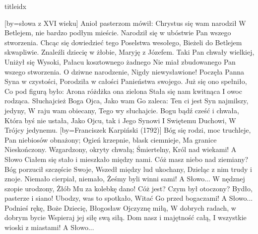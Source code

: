 \documentclass[a5paper, portrait, 12pt]{mwart}
\begin{document}
\begin{songs}{titleidx}

[by={słowa z XVI wieku}]
\beginverse
    Anioł pasterzom mówił:
    Chrystus się wam narodził
    W Betlejem, nie bardzo podłym mieście.
    Narodził się w ubóstwie
    Pan wszego stworzenia.
\endverse
\beginverse
    Chcąc się dowiedzieć tego
    Poselstwa wesołego,
    Bieżeli do Betlejem skwapliwie.
    Znaleźli dziecię w żłobie,
    Maryję z Józefem.
\endverse
\beginverse
    Taki Pan chwały wielkiej,
    Uniżył się Wysoki,
    Pałacu kosztownego żadnego
    Nie miał zbudowanego
    Pan wszego stworzenia.
\endverse
\beginverse
    O dziwne narodzenie,
    Nigdy niewysławione!
    Poczęła Panna Syna w czystości,
    Porodziła w całości
    Panieństwa swojego.
\endverse
\beginverse %
    Już się ono spełniło,
    Co pod figurą było:
    Arona różdżka ona zielona
    Stała się nam kwitnąca
    I owoc rodząca.
\endverse
\beginverse
    Słuchajcież Boga Ojca,
    Jako wam Go zaleca:
    Ten ci jest Syn najmilszy, jedyny,
    W raju wam obiecany,
    Tego wy słuchajcie.
\endverse
\beginverse
    Bogu bądź cześć i chwała,
    Która byś nie ustała,
    Jako Ojcu, tak i Jego Synowi
    I Swiętemu Duchowi,
    W Trójcy jedynemu.
\endverse
\endsong
[by={Franciszek Karpiński (1792)}]
\beginverse
    Bóg się rodzi, moc truchleje,
    Pan niebiosów obnażony;
    Ogień krzepnie, blask ciemnieje,
    Ma granice Nieskończony.
    Wzgardzony, okryty chwałą;
    Śmiertelny, Król nad wiekami!
\endverse
\beginchorus
	A Słowo Ciałem się stało
	i mieszkało między nami.
\endchorus
\beginverse
    Cóż masz niebo nad ziemiany?
    Bóg porzucił szczęście Swoje,
    Wszedł między lud ukochany,
    Dzieląc z nim trudy i znoje.
    Niemało cierpiał, niemało,
    Żeśmy byli winni sami!
\endverse
\beginchorus
	A Słowo...
\endchorus
\beginverse
    W nędznej szopie urodzony,
    Żłób Mu za kolebkę dano!
    Cóż jest? Czym był otoczony?
    Bydło, pasterze i siano!
    Ubodzy, was to spotkało,
    Witać Go przed bogaczami!
\endverse
\beginchorus
	A Słowo...
\endchorus
\beginverse
    Podnieś rękę, Boże Dziecię,
    Błogosław Ojczyznę miłą,
    W dobrych radach, w dobrym bycie
    Wspieraj jej siłę swą siłą.
    Dom nasz i majętność całą,
    I wszystkie wioski z miastami!
\endverse
\beginchorus
	A Słowo...
\endchorus
\endsong


\end{songs}
\end{document}
